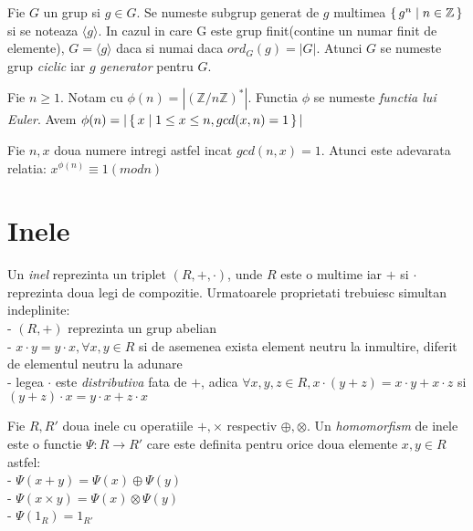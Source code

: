 \begin{dfn}
Fie $G$ un grup si $g \in G$. Se numeste subgrup generat de $g$ multimea $\set{g^n\mid n\in \mathbb{Z}}$ si se noteaza $\langle g \rangle$. In cazul in care G este grup finit(contine un numar finit de elemente), $G = \langle g \rangle$ daca si numai daca $ord_G(g) = |G|$. Atunci $G$ se numeste grup \textit{ciclic} iar $g$ \textit{generator} pentru $G$.
\end{dfn}

 \begin{dfn}
 Fie $n\geq 1$. Notam cu $\phi (n) = |(\mathbb{Z}/n\mathbb{Z})^{*}|$. Functia $\phi$ se numeste \textit{functia lui Euler}. Avem $\phi (n) = |\set{x\mid 1\leq x\leq n, gcd(x, n)=1}|$
 \end{dfn}
 
 \begin{teo}
 Fie $n, x$ doua numere intregi astfel incat $gcd(n,x)=1$. Atunci este adevarata relatia:
  $x^{\phi(n)}\equiv 1 (mod n)$
 \end{teo}


\section{Inele}
\label{sec:sec02}

\begin{dfn}
Un \textit{inel} reprezinta un triplet $(R, +, \cdot)$, unde $R$ este o multime iar $+$ si $\cdot$ reprezinta doua legi de compozitie. Urmatoarele proprietati trebuiesc simultan indeplinite: 
\\ - $(R, +)$ reprezinta un grup abelian
\\ - $x \cdot y = y \cdot x, \forall x,y\in R$ si de asemenea exista element neutru la inmultire, diferit de elementul neutru la adunare
\\ - legea $\cdot$ este \textit{distributiva} fata de $+$, adica $\forall x,y,z\in R, x\cdot (y + z) = x\cdot y + x\cdot z$ si $(y + z)\cdot x = y\cdot x + z\cdot x$ 
\end{dfn}

\begin{dfn}
Fie $R, R'$ doua inele cu operatiile $+, \times$ respectiv $\oplus, \otimes$. Un \textit{homomorfism} de inele este o functie $\Psi : R\rightarrow R'$ care este definita pentru orice doua elemente $x, y\in R$ astfel:
\\ - $\Psi (x+y) = \Psi (x) \oplus \Psi (y)$
\\ - $\Psi (x\times y) = \Psi (x) \otimes \Psi (y)$
\\ - $\Psi (1_R) = 1_{R'}$
\end{dfn}

